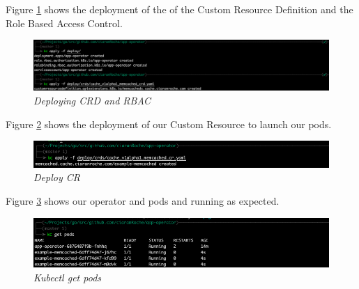Figure \ref{img:olm3} shows the deployment of the of the Custom Resource Definition and the Role Based Access Control.
\begin{figure}[!ht]
\centering
\includegraphics*[width=1\textwidth]{images/olm3.png}
\caption{\em Deploying CRD and RBAC}
\label{img:olm3}
\end{figure}

Figure \ref{img:olm4} shows the deployment of our Custom Resource to launch our pods.
\begin{figure}[!ht]
\centering
\includegraphics*[width=1\textwidth]{images/olm4.png}
\caption{\em Deploy CR}
\label{img:olm4}
\end{figure}

Figure \ref{img:olm5} shows our operator and pods and running as expected.
\begin{figure}[!ht]
\centering
\includegraphics*[width=1\textwidth]{images/olm5.png}
\caption{\em Kubectl get pods}
\label{img:olm5}
\end{figure}

